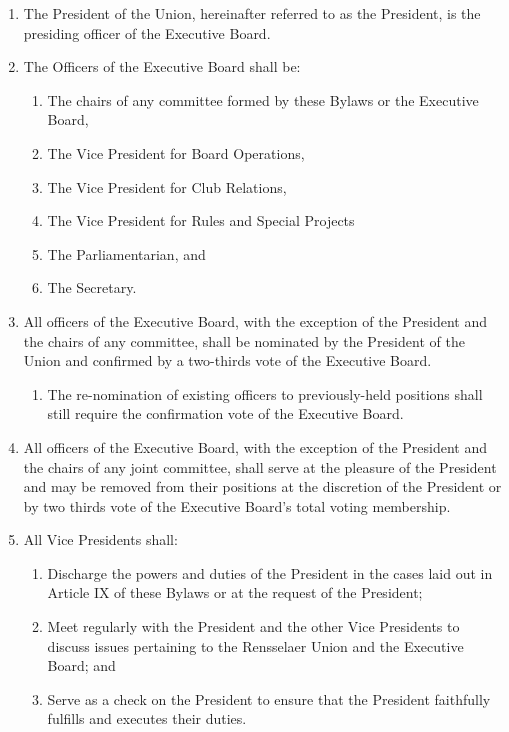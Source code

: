 \documentclass{uniondoc}
\begin{document}

\begin{enumerate}
\item The President of the Union, hereinafter referred to as the President, is the presiding officer of the Executive Board.
\item The Officers of the Executive Board shall be:
  \begin{enumerate}
  \item The chairs of any committee formed by these Bylaws or the Executive Board,
  \item The Vice President for Board Operations,
  \item The Vice President for Club Relations,
  \item The Vice President for Rules and Special Projects
  \item The Parliamentarian, and
  \item The Secretary.
  \end{enumerate}
\item All officers of the Executive Board, with the exception of the President and the chairs of any committee, shall be nominated by the President of the Union and confirmed by a two-thirds vote of the Executive Board.
  \begin{enumerate}
  \item The re-nomination of existing officers to previously-held positions shall still require the confirmation vote of the Executive Board.
  \end{enumerate}
\item All officers of the Executive Board, with the exception of the President and the chairs of any joint committee, shall serve at the pleasure of the President and may be removed from their positions at the discretion of the President or by two thirds vote of the Executive Board’s total voting membership.
\item All Vice Presidents shall:
  \begin{enumerate}
  \item Discharge the powers and duties of the President in the cases laid out in Article IX of these Bylaws or at the request of the President;
  \item Meet regularly with the President and the other Vice Presidents to discuss issues pertaining to the Rensselaer Union and the Executive Board; and
  \item Serve as a check on the President to ensure that the President faithfully fulfills and executes their duties.

\end{enumerate}
\end{enumerate}
\end{document}
